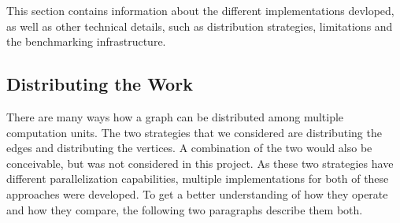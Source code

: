 \documentclass[letterpaper]{article}
\begin{document}

This section contains information about the different implementations devloped, as well as other technical
details, such as distribution strategies, limitations and the benchmarking infrastructure.

\subsection{Distributing the Work}
There are many ways how a graph can be distributed among multiple computation units. The two strategies that we
considered are distributing the edges and distributing the vertices. A combination of the two would also be conceivable,
but was not considered in this project. As these two strategies have different parallelization capabilities, multiple
implementations for both of these approaches were developed. To get a better understanding of how they operate and how
they compare, the following two paragraphs describe them both.
\end{document}
